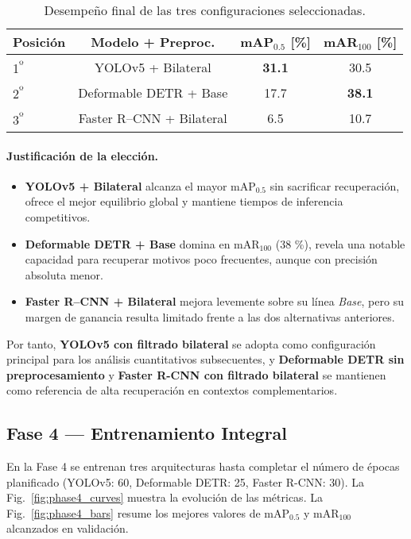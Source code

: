 \begin{table}[!ht]
  \centering
  \begin{tabular}{lccc}
    \hline
    \textbf{Posición} & \textbf{Modelo + Preproc.} & \textbf{mAP\(_{0.5}\) [\%]} & \textbf{mAR\(_{100}\) [\%]}\\
    \hline
    1\textsuperscript{º} & YOLOv5 + Bilateral           & \textbf{31.1} & 30.5\\
    2\textsuperscript{º} & Deformable DETR + Base       & 17.7 & \textbf{38.1}\\
    3\textsuperscript{º} & Faster R–CNN + Bilateral     & 6.5  & 10.7\\
    \hline
  \end{tabular}
  \caption[Ranking de configuraciones óptimas]{Desempeño final de las tres configuraciones seleccionadas.}
  \label{tab:fase3_ranking}
\end{table}

\paragraph{Justificación de la elección.}
\begin{itemize}
  \item \textbf{YOLOv5 + Bilateral} alcanza el mayor mAP\(_{0.5}\) sin sacrificar recuperación, ofrece el mejor equilibrio global y mantiene tiempos de inferencia competitivos.
  \item \textbf{Deformable DETR + Base} domina en mAR\(_{100}\) (38 \%), revela una notable capacidad para recuperar motivos poco frecuentes, aunque con precisión absoluta menor.
  \item \textbf{Faster R–CNN + Bilateral} mejora levemente sobre su línea \textit{Base}, pero su margen de ganancia resulta limitado frente a las dos alternativas anteriores.
\end{itemize}

Por tanto, \textbf{YOLOv5 con filtrado bilateral} se adopta como configuración principal para los análisis cuantitativos subsecuentes, y \textbf{Deformable DETR sin preprocesamiento} y \textbf{Faster R-CNN con filtrado bilateral} se mantienen como referencia de alta recuperación en contextos complementarios.

\subsection{Fase 4 — Entrenamiento Integral}
\label{ssec:fase4_integral}

En la Fase 4 se entrenan tres arquitecturas hasta completar el número de épocas planificado (YOLOv5: 60, Deformable DETR: 25, Faster R-CNN: 30).
La Fig.~\ref{fig:phase4_curves} muestra la evolución de las métricas.
La Fig.~\ref{fig:phase4_bars} resume los mejores valores de mAP\(_{0.5}\) y mAR\(_{100}\) alcanzados en validación.

